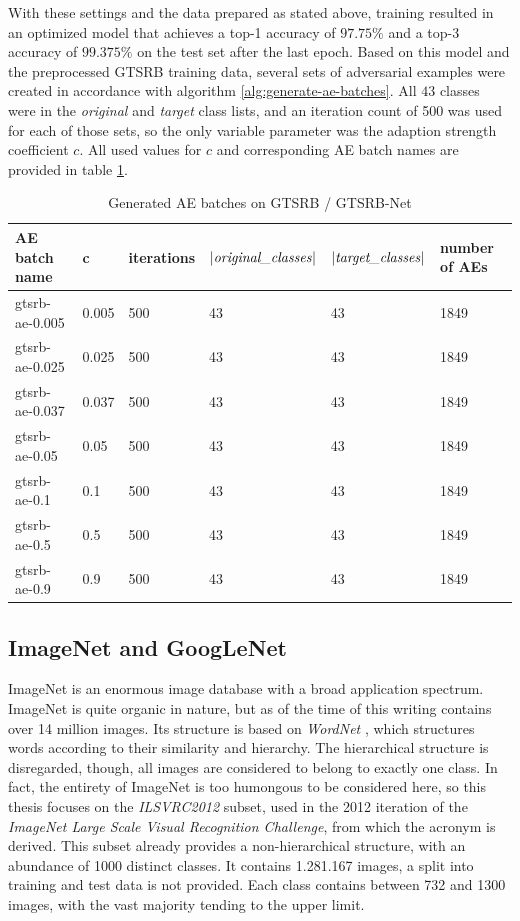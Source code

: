 \documentclass[11pt, a4paper]{article}
\newcommand{\abs}[1]{\left\lvert#1\right\rvert}
\begin{document}
With these settings and the data prepared as stated above, training resulted in an optimized model that achieves a top-1 accuracy of $97.75\%$ and a top-3 accuracy of $99.375\%$ on the test set after the last epoch. Based on this model and the preprocessed GTSRB training data, several sets of adversarial examples were created in accordance with algorithm \ref{alg:generate-ae-batches}. All $43$ classes were in the \emph{original} and \emph{target} class lists, and an iteration count of 500 was used for each of those sets, so the only variable parameter was the adaption strength coefficient $c$. All used values for $c$ and corresponding AE batch names are provided in table \ref{tab:gtsrb-ae-batches}.

\begin{table}[h!tb]
	\centering
	\begin{tabular}{|l|l|l|l|l|l|}
		\hline
		AE batch name & c & iterations & $\abs{\text{\emph{original\_classes}}}$ & $\abs{\text{\emph{target\_classes}}}$ & number of AEs \\
		\hline
		gtsrb-ae-0.005 & 0.005 & 500 & 43 & 43 & 1849 \\
		gtsrb-ae-0.025 & 0.025 & 500 & 43 & 43 & 1849 \\
		gtsrb-ae-0.037 & 0.037 & 500 & 43 & 43 & 1849 \\
		gtsrb-ae-0.05 & 0.05 & 500 & 43 & 43 & 1849 \\
		gtsrb-ae-0.1 & 0.1 & 500 & 43 & 43 & 1849 \\
		gtsrb-ae-0.5 & 0.5 & 500 & 43 & 43 & 1849 \\
		gtsrb-ae-0.9 & 0.9 & 500 & 43 & 43 & 1849 \\
		\hline
	\end{tabular}
	\caption[Description of AE batches generated on GTSRB / GTSRB-Net]{Generated AE batches on GTSRB / GTSRB-Net}
	\label{tab:gtsrb-ae-batches}
\end{table}

\subsection{ImageNet and GoogLeNet}
\label{sec:generation-large-sets:imagenet}
ImageNet \cite{imagenet-large-scale-hierarchical-image-database} is an enormous image database with a broad application spectrum. ImageNet is quite organic in nature, but as of the time of this writing contains over 14 million images. Its structure is based on \emph{WordNet} \cite{wordnet-a-lexical-database-for-english}, which structures words according to their similarity and hierarchy. The hierarchical structure is disregarded, though, all images are considered to belong to exactly one class. In fact, the entirety of ImageNet is too humongous to be considered here, so this thesis focuses on the \emph{ILSVRC2012} subset, used in the 2012 iteration of the \emph{ImageNet Large Scale Visual Recognition Challenge}, from which the acronym is derived. This subset already provides a non-hierarchical structure, with an abundance of 1000 distinct classes. It contains 1.281.167 images, a split into training and test data is not provided. Each class contains between 732 and 1300 images, with the vast majority tending to the upper limit.
\end{document}
